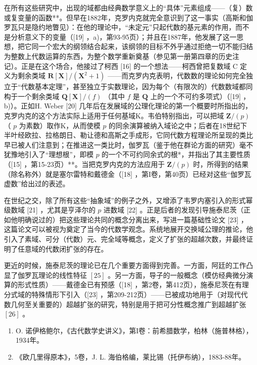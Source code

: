 在所有这些研究中，出现的域都由经典数学意义上的“具体”元素组成——（复）数或复变量的函数**。但早在1882年，克罗内克就完全意识到了这一事实（高斯和伽罗瓦只是隐约地瞥见）：在他的理论中，“未定元”只起代数的基元素的作用，而不是分析意义下的变量（{[}19{]} ，a)，第93-95页）；并且在1887年，他发展了这一思想，把它同一个宏大的纲领结合起来，该纲领的目标不外乎通过拒绝一切不能归结为整数上代数运算的东西，为整个数学重新奠基（参见第一册第四章的历史注记）。正是在这个场合，他接过了柯西 {[}16{]} 的一个想法——柯西曾把复数域 C 定义为剩余类域 \(\mathbf{R}[\mathbf{X}] / (\mathbf{X}^2 + 1)\) ——而克罗内克表明，代数数的理论如何完全独立于“代数基本定理”，甚至独立于实数理论，因为每个（有限次的）代数数域都同构于一个剩余类域 \(\mathbf{Q}[\mathbf{X}] / (f)\) （其中 \(f\) 是 \(\mathbf{Q}\) 上的一个不可约多项式）（{[}19{]} ，b)）。正如H. Weber {[}20{]} 几年后在发展域的公理化理论的第一个概要时所指出的，克罗内克的这个方法实际上适用于任何基域K。韦伯特别指出，可以把域 \(\mathbf{Z}/(p)\) （ \(p\) 为素数）取作K，从而使模 \(p\) 的同余演算被纳入域论之中；后者在18世纪下半叶经欧拉、拉格朗日、勒让德和高斯之手成形，它同代数方程理论所呈现的类比早已被人们注意到；在推进这一类比时，伽罗瓦（鉴于他在群论方面的研究）毫不犹豫地引入了“理想根”，即模 \(p\) 的一个不可约同余式的根*，并指出了其主要性质（{[}15{]} ，第15-23页）**。当把克罗内克的方法应用于 \(\mathbf{Z}/(p)\) 时，所得到的结果（除名称外）就是塞尔雷特和戴德金（{[}18{]} ，第I卷，第40页）已经对这些“伽罗瓦虚数”给出过的表述。

在世纪之交，除了所有这些“抽象域”的例子之外，又增添了韦罗内塞引入的形式幂级数域 {[}21{]} ，尤其是亨泽尔的 \(p\) 进数域 {[}22{]} 。正是后者的发现引导施泰尼茨（正如他明确说过的）把这些理论共同的概念分离出来，写进一篇基础性论文 {[}23{]} ，这篇论文可以被视为奠定了当今的代数学观念。系统地展开交换域公理的推论，他引入了素域、可分（代数）元、完全域等概念，定义了扩张的超越次数，并最终证明了任意域的代数闭扩张的存在。

更近的时候，施泰尼茨的理论已在几个重要方面得到完善。一方面，阿廷的工作凸显了伽罗瓦理论的线性特征 \([25]\) 。另一方面，导子的一般概念（模仿经典微分演算的形式性质）——戴德金已有预感（{[}18{]} ，第2卷，第412页），施泰尼茨在有理分式域的特殊情形下引入（{[}23{]} ，第209-212页）——已被成功地用于（对现代代数几何至关重要的）超越扩张的研究，特别是用于把可分性概念推广到超越扩张 \([26]\) 。


\begin{enumerate}
\def\labelenumi{\arabic{enumi}.}
\item
  O. 诺伊格鲍尔，《古代数学史讲义》，第I卷：前希腊数学，柏林（施普林格），1934年。
\item
  《欧几里得原本》，5卷，J. L. 海伯格编，莱比锡（托伊布纳），1883-88年。
\end{enumerate}

